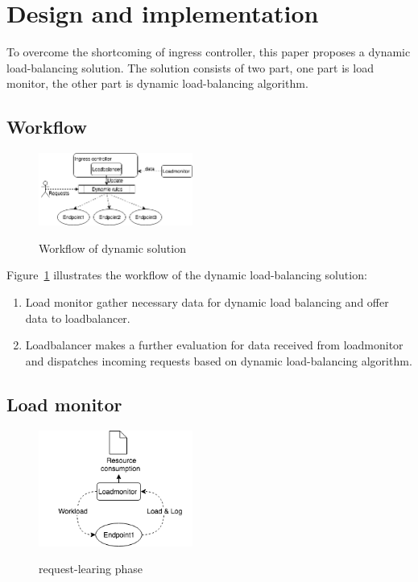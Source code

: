 \section{Design and implementation}
\label{sec:Design}

To overcome the shortcoming of ingress controller, this paper proposes a dynamic load-balancing solution. The solution consists of two part, one part is load monitor, the other part is dynamic load-balancing algorithm.

\subsection{Workflow}
\label{subsec:workflow}
\begin{figure}[htbp]
  \centering
  \includegraphics[width=0.45\textwidth]{images/dynamic_solution.png}\\
  \caption{Workflow of dynamic solution}
  \label{fig:dynamic_solution}
\end{figure}
Figure~{\ref{fig:dynamic_solution}} illustrates the workflow of the dynamic load-balancing solution:
\begin{enumerate}[label=(\arabic*)]
  \item Load monitor gather necessary data for dynamic load balancing and offer data to loadbalancer.
  \item Loadbalancer makes a further evaluation for data received from loadmonitor and dispatches incoming requests based on dynamic load-balancing algorithm.
  \end{enumerate}

\subsection{Load monitor}
\label{subsec:load_monitor}

\begin{figure}[htbp]
  \centering
  \includegraphics[width=0.45\textwidth]{images/request_learning.png}\\
  \caption{request-learing phase}
  \label{fig:request_learning}
\end{figure}


